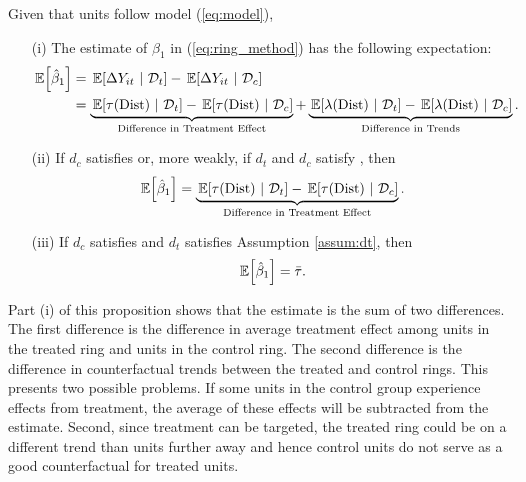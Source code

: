 \begin{proposition}\label{prop:ring_decomp}  
    Given that units follow model (\ref{eq:model}),
    \begin{enumerate}
        \item[(i)] The estimate of $\beta_1$ in (\ref{eq:ring_method}) has the following expectation:
        \begin{align*}
            \expec{\hat{\beta}_1} &= \expec{\Delta Y_{it}}{\mathcal{D}_t} - \expec{\Delta Y_{it}}{\mathcal{D}_c} \\
            &=  \underbrace{\expec{\tau(\dist)}{\mathcal{D}_t} - \expec{\tau(\dist)}{\mathcal{D}_c} }_{\text{Difference in Treatment Effect}} + \underbrace{\expec{\lambda(\dist)}{\mathcal{D}_t} - \expec{\lambda(\dist)}{\mathcal{D}_c} }_{\text{Difference in Trends}}.
        \end{align*}
        
        \item[(ii)] If $d_c$ satisfies  or, more weakly, if $d_t$ and $d_c$ satisfy , then
        \[ 
            \expec{\hat{\beta}_1} = 
            \underbrace{\expec{\tau(\dist)}{\mathcal{D}_t} - \expec{\tau(\dist)}{\mathcal{D}_c} }_{\text{Difference in Treatment Effect}}.
        \] 
    
        \item[(iii)] If $d_c$ satisfies  and $d_t$ satisfies Assumption \ref{assum:dt}, then
        \[ 
            \expec{\hat{\beta}_1} = \bar{\tau}.
        \]
    \end{enumerate}
\end{proposition}

Part (i) of this proposition shows that the estimate is the sum of two differences. The first difference is the difference in average treatment effect among units in the treated ring and units in the control ring. The second difference is the difference in counterfactual trends between the treated and control rings. This presents two possible problems. If some units in the control group experience effects from treatment, the average of these effects will be subtracted from the estimate. Second, since treatment can be targeted, the treated ring could be on a different trend than units further away and hence control units do not serve as a good counterfactual for treated units.

